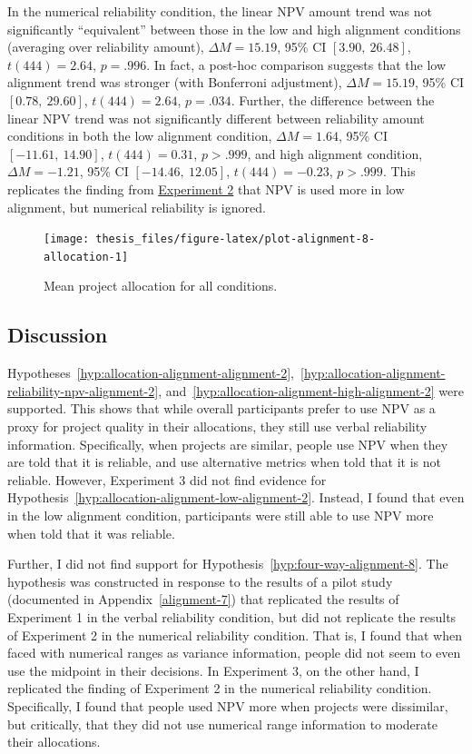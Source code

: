 \documentclass[a4paper, nobind, dvipsnames]{templates/ociamthesis}
\theoremstyle{definition}
\theoremstyle{definition}
\theoremstyle{definition}
\theoremstyle{definition}
\theoremstyle{remark}
\begin{document}
In the numerical reliability condition, the linear NPV amount trend was not
significantly ``equivalent'' between those in the low and high alignment
conditions (averaging over reliability amount),
\(\Delta M = 15.19\), 95\% CI \([3.90,~26.48]\), \(t(444) = 2.64\), \(p = .996\). In
fact, a post-hoc comparison suggests that the low alignment trend was stronger
(with Bonferroni adjustment),
\(\Delta M = 15.19\), 95\% CI \([0.78,~29.60]\), \(t(444) = 2.64\), \(p = .034\). Further,
the difference between the linear NPV trend was not significantly different
between reliability amount conditions in both the low alignment condition,
\(\Delta M = 1.64\), 95\% CI \([-11.61,~14.90]\), \(t(444) = 0.31\), \(p > .999\),
and high alignment condition,
\(\Delta M = -1.21\), 95\% CI \([-14.46,~12.05]\), \(t(444) = -0.23\), \(p > .999\).
This replicates the finding from \href{results-alignment-3}{Experiment 2} that NPV is
used more in low alignment, but numerical reliability is ignored.



\begin{figure}
\texttt{[image: thesis\_files/figure-latex/plot-alignment-8-allocation-1]} \caption{Mean project allocation for all conditions.}\label{fig:plot-alignment-8-allocation}
\end{figure}

\subsection{Discussion}

Hypotheses~\ref{hyp:allocation-alignment-alignment-2},~\ref{hyp:allocation-alignment-reliability-npv-alignment-2},
and~\ref{hyp:allocation-alignment-high-alignment-2} were supported. This shows
that while overall participants prefer to use NPV as a proxy for project quality
in their allocations, they still use verbal reliability information.
Specifically, when projects are similar, people use NPV when they are told that
it is reliable, and use alternative metrics when told that it is not reliable.
However, Experiment 3 did not find evidence for
Hypothesis~\ref{hyp:allocation-alignment-low-alignment-2}. Instead, I found
that even in the low alignment condition, participants were still able to use
NPV more when told that it was reliable.

Further, I did not find support for Hypothesis~\ref{hyp:four-way-alignment-8}.
The hypothesis was constructed in response to the results of a pilot study
(documented in Appendix~\ref{alignment-7}) that replicated the results of
Experiment 1 in the verbal reliability condition, but did not replicate the
results of Experiment 2 in the numerical reliability condition. That is, I found
that when faced with numerical ranges as variance information, people did not
seem to even use the midpoint in their decisions. In Experiment 3, on the other
hand, I replicated the finding of Experiment 2 in the numerical reliability
condition. Specifically, I found that people used NPV more when projects were
dissimilar, but critically, that they did not use numerical range information to
moderate their allocations.
\end{document}

